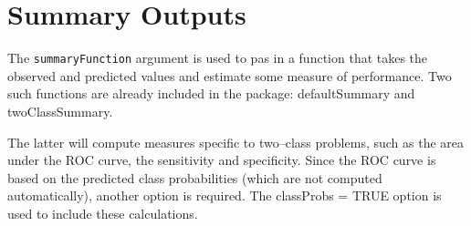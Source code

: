 \documentclass[caret-main.tex]{subfiles}
\begin{document}
\section{Summary Outputs}
The \texttt{summaryFunction} argument is used to pas in a function that takes the observed and predicted
values and estimate some measure of performance. Two such functions are already included in the
package: defaultSummary and twoClassSummary. 

The latter will compute measures speciﬁc to two–class
problems, such as the area under the ROC curve, the sensitivity and speciﬁcity. Since the ROC
curve is based on the predicted class probabilities (which are not computed automatically), another
option is required. The classProbs = TRUE option is used to include these calculations.
\end{document}
